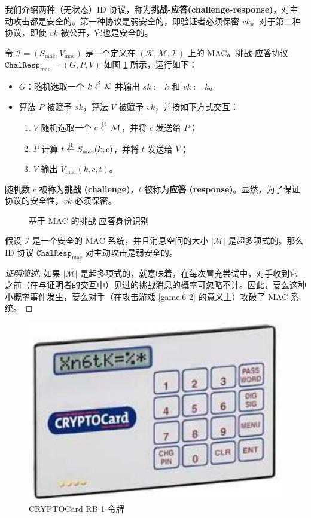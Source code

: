 我们介绍两种（无状态）ID 协议，称为\textbf{挑战-应答(challenge-response)}，对主动攻击都是安全的。第一种协议是弱安全的，即验证者必须保密 $vk$。对于第二种协议，即使 $vk$ 被公开，它也是安全的。

令 $\mathcal{I}=(S_\mathrm{mac},V_\mathrm{mac})$ 是一个定义在 $(\mathcal{K},\mathcal{M},\mathcal{T})$ 上的 MAC。挑战-应答协议 $\mathtt{ChalResp}_\mathrm{mac} = (G,P,V)$ 如图 \ref{fig:18-11} 所示，运行如下：
\begin{itemize}
	\item $G$：随机选取一个 $k\overset{\rm R}\leftarrow\mathcal{K}$ 并输出 $sk:=k$ 和 $vk:=k$。
	\item 算法 $P$ 被赋予 $sk$，算法 $V$ 被赋予 $vk$，并按如下方式交互：
	\begin{enumerate}
		\item $V$ 随机选取一个 $c\overset{\rm R}\leftarrow\mathcal{M}$，并将 $c$ 发送给 $P$；
		\item $P$ 计算 $t\overset{\rm R}\leftarrow S_\mathrm{mac}(k,c)$，并将 $t$ 发送给 $V$；
		\item $V$ 输出 $V_\mathrm{mac}(k,c,t)$。
	\end{enumerate}
\end{itemize}
随机数 $c$ 被称为\textbf{挑战 (challenge)}，$t$ 被称为\textbf{应答 (response)}。显然，为了保证协议的安全性，$vk$ 必须保密。

\begin{figure}
  \centering
  
  \caption{基于 MAC 的挑战-应答身份识别}
  \label{fig:18-11}
\end{figure}

\begin{theorem}\label{theo:18-6}
假设 $\mathcal{I}$ 是一个安全的 MAC 系统，并且消息空间的大小 $|\mathcal{M}|$ 是超多项式的。那么 ID 协议 $\mathtt{ChalResp}_\mathrm{mac}$ 对主动攻击是弱安全的。
\end{theorem}

\begin{proof}[证明简述]
如果 $|\mathcal{M}|$ 是超多项式的，就意味着，在每次冒充尝试中，对手收到它之前（在与证明者的交互中）见过的挑战消息的概率可忽略不计。因此，要么这种小概率事件发生，要么对手（在攻击游戏 \ref{game:6-2} 的意义上）攻破了 MAC 系统。
\end{proof}

\begin{figure}
  \centering
  \includegraphics[width=0.25\linewidth]{figures/chapter18/fig12.png}
  \caption{CRYPTOCard RB-1 令牌}
  \label{fig:18-12}
\end{figure}


